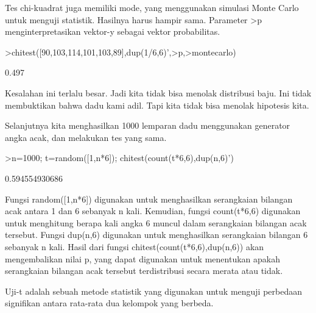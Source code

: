 \documentclass[a4paper,10pt]{article}
\begin{document}
\begin{eulernotebook}
\begin{eulercomment}
\begin{eulercomment}
\begin{eulercomment}
\begin{eulercomment}
\begin{eulercomment}
\begin{eulercomment}
\begin{eulercomment}
\begin{eulercomment}
\begin{eulercomment}
\begin{eulercomment}
\begin{eulercomment}
\begin{eulercomment}
\begin{eulercomment}
\begin{eulercomment}
\begin{eulercomment}
\begin{eulercomment}
\begin{eulercomment}
\begin{eulercomment}
\begin{eulercomment}
Tes chi-kuadrat juga memiliki mode, yang menggunakan simulasi Monte
Carlo untuk menguji statistik. Hasilnya harus hampir sama. Parameter
\textgreater{}p menginterpretasikan vektor-y sebagai vektor probabilitas.
\end{eulercomment}
\begin{eulerprompt}
>chitest([90,103,114,101,103,89],dup(1/6,6)',>p,>montecarlo)
\end{eulerprompt}
\begin{euleroutput}
  0.497
\end{euleroutput}
\begin{eulercomment}
Kesalahan ini terlalu besar. Jadi kita tidak bisa menolak distribusi
baju. Ini tidak membuktikan bahwa dadu kami adil. Tapi kita tidak bisa
menolak hipotesis kita.

Selanjutnya kita menghasilkan 1000 lemparan dadu menggunakan generator
angka acak, dan melakukan tes yang sama.
\end{eulercomment}
\begin{eulerprompt}
>n=1000; t=random([1,n*6]); chitest(count(t*6,6),dup(n,6)')
\end{eulerprompt}
\begin{euleroutput}
  0.594554930686
\end{euleroutput}
\begin{eulercomment}
Fungsi random([1,n*6]) digunakan untuk menghasilkan serangkaian
bilangan acak antara 1 dan 6 sebanyak n kali. Kemudian, fungsi
count(t*6,6) digunakan untuk menghitung berapa kali angka 6 muncul
dalam serangkaian bilangan acak tersebut. Fungsi dup(n,6) digunakan
untuk menghasilkan serangkaian bilangan 6 sebanyak n kali. Hasil dari
fungsi chitest(count(t*6,6),dup(n,6)) akan mengembalikan nilai p, yang
dapat digunakan untuk menentukan apakah serangkaian bilangan acak
tersebut terdistribusi secara merata atau tidak.

\end{eulercomment}
\begin{eulercomment}
Uji-t adalah sebuah metode statistik yang digunakan untuk menguji
perbedaan signifikan antara rata-rata dua kelompok yang berbeda.


\end{eulercomment}
\end{eulercomment}
\end{eulercomment}
\end{eulercomment}
\end{eulercomment}
\end{eulercomment}
\end{eulercomment}
\end{eulercomment}
\end{eulercomment}
\end{eulercomment}
\end{eulercomment}
\end{eulercomment}
\end{eulercomment}
\end{eulercomment}
\end{eulercomment}
\end{eulercomment}
\end{eulercomment}
\end{eulercomment}
\end{eulercomment}
\end{eulernotebook}
\end{document}
